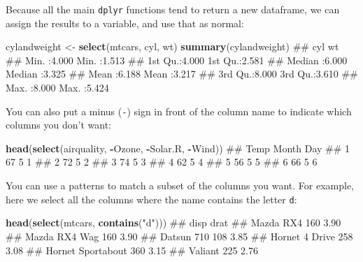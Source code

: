\documentclass[]{article}
\newenvironment{Shaded}{\begin{snugshade}}{\end{snugshade}}
\newcommand{\KeywordTok}[1]{\textcolor[rgb]{0.13,0.29,0.53}{\textbf{#1}}}
\newcommand{\StringTok}[1]{\textcolor[rgb]{0.31,0.60,0.02}{#1}}
\newcommand{\OperatorTok}[1]{\textcolor[rgb]{0.81,0.36,0.00}{\textbf{#1}}}
\newcommand{\NormalTok}[1]{#1}
\theoremstyle{definition}
\theoremstyle{definition}
\theoremstyle{definition}
\theoremstyle{remark}
\begin{document}
Because all the main \texttt{dplyr} functions tend to return a new
dataframe, we can assign the results to a variable, and use that as
normal:

\begin{Shaded}
\begin{Highlighting}[]
\NormalTok{cylandweight <-}\StringTok{ }\KeywordTok{select}\NormalTok{(mtcars, cyl, wt)}
\KeywordTok{summary}\NormalTok{(cylandweight)}
\NormalTok{##       cyl              wt       }
\NormalTok{##  Min.   :4.000   Min.   :1.513  }
\NormalTok{##  1st Qu.:4.000   1st Qu.:2.581  }
\NormalTok{##  Median :6.000   Median :3.325  }
\NormalTok{##  Mean   :6.188   Mean   :3.217  }
\NormalTok{##  3rd Qu.:8.000   3rd Qu.:3.610  }
\NormalTok{##  Max.   :8.000   Max.   :5.424}
\end{Highlighting}
\end{Shaded}

You can also put a minus (\texttt{-}) sign in front of the column name
to indicate which columns you don't want:

\begin{Shaded}
\begin{Highlighting}[]
\KeywordTok{head}\NormalTok{(}\KeywordTok{select}\NormalTok{(airquality, }\OperatorTok{-}\NormalTok{Ozone, }\OperatorTok{-}\NormalTok{Solar.R, }\OperatorTok{-}\NormalTok{Wind))}
\NormalTok{##   Temp Month Day}
\NormalTok{## 1   67     5   1}
\NormalTok{## 2   72     5   2}
\NormalTok{## 3   74     5   3}
\NormalTok{## 4   62     5   4}
\NormalTok{## 5   56     5   5}
\NormalTok{## 6   66     5   6}
\end{Highlighting}
\end{Shaded}

You can use a patterns to match a subset of the columns you want. For
example, here we select all the columns where the name contains the
letter \texttt{d}:

\begin{Shaded}
\begin{Highlighting}[]
\KeywordTok{head}\NormalTok{(}\KeywordTok{select}\NormalTok{(mtcars, }\KeywordTok{contains}\NormalTok{(}\StringTok{"d"}\NormalTok{)))}
\NormalTok{##                   disp drat}
\NormalTok{## Mazda RX4          160 3.90}
\NormalTok{## Mazda RX4 Wag      160 3.90}
\NormalTok{## Datsun 710         108 3.85}
\NormalTok{## Hornet 4 Drive     258 3.08}
\NormalTok{## Hornet Sportabout  360 3.15}
\NormalTok{## Valiant            225 2.76}
\end{Highlighting}
\end{Shaded}
\end{document}
